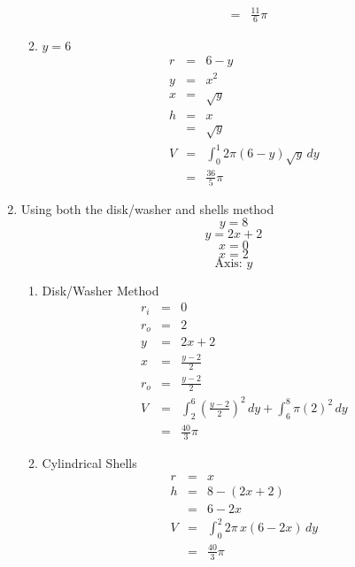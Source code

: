 \documentclass{article}
\begin{document}
\begin{enumerate}
\begin{enumerate}
\begin{eqnarray}
                      &=& \frac{11}{6}\pi
                \end{eqnarray}
            \item $y = 6$
                \begin{eqnarray}
                    r &=& 6 - y \\
                    y &=& x^2 \\
                    x &=& \sqrt{y} \\
                    h &=& x \\
                      &=& \sqrt{y} \\
                    V &=& \int_0^1{2\pi\left(6 - y\right)\sqrt{y}\,dy} \\
                      &=& \frac{36}{5}\pi
                \end{eqnarray}
        \end{enumerate}
    \item Using both the disk/washer and shells method
        $$y = 8$$
        $$y = 2x + 2$$
        $$x = 0$$
        $$x = 2$$
        $$\text{Axis: } y$$
        \begin{enumerate}
            \item Disk/Washer Method
                \begin{eqnarray}
                    r_i &=& 0 \\
                    r_o &=& 2 \\
                    y &=& 2x + 2 \\
                    x &=& \frac{y - 2}{2} \\
                    r_o &=& \frac{y - 2}{2} \\
                    V &=& \int_2^6{\left(\frac{y - 2}{2}\right)^2\,dy} + \int_6^8{\pi\left(2\right)^2\,dy} \\
                      &=& \frac{40}{3}\pi
                \end{eqnarray}
            \item Cylindrical Shells
                \begin{eqnarray}
                    r &=& x \\
                    h &=& 8 - \left(2x + 2\right) \\
                      &=& 6 - 2x \\
                    V &=& \int_0^2{2\pi\,x\left(6 - 2x\right)\,dy} \\
                      &=& \frac{40}{3}\pi
                \end{eqnarray}
        \end{enumerate}
\end{enumerate}
\end{document}
